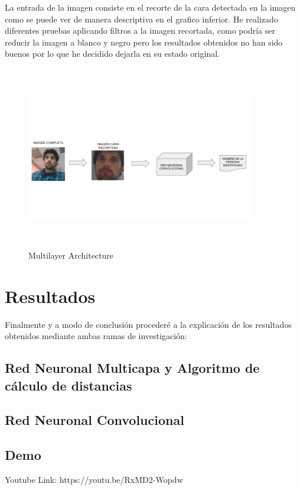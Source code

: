 \documentclass{article}
\begin{document}
La entrada de la imagen consiste en el recorte de la cara detectada en la imagen como se puede ver de manera descriptiva en el grafico inferior. He realizado diferentes pruebas aplicando filtros a la imagen recortada, como podría ser reducir la imagen a blanco y negro pero los resultados obtenidos no han sido buenos por lo que he decidido dejarla en su estado original.

\begin{figure}[H]
  \centering
  \includegraphics[width=100mm, height=80mm]{images/Flowchart_conv.png}
  \caption{Multilayer Architecture}
\end{figure}

\section{Resultados}
Finalmente y a modo de conclusión procederé a la explicación de los resultados obtenidos mediante ambas ramas de investigación:

\subsection{Red Neuronal Multicapa y Algoritmo de cálculo de distancias}


\subsection{Red Neuronal Convolucional}

\subsection{Demo}
Youtube Link:
https://youtu.be/RxMD2-Wopdw



\end{document}

